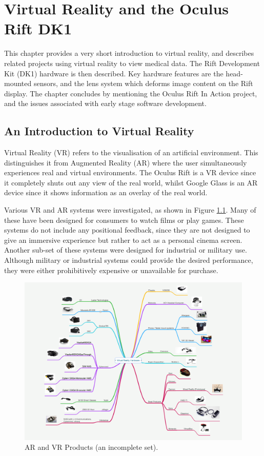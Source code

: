 \documentclass[MSc,paper=a4,pagesize=auto]{icldt}
\begin{document}
\chapter{Virtual Reality and the Oculus Rift DK1}
This chapter provides a very short introduction to virtual reality, and describes related projects using virtual reality to view medical data. The Rift Development Kit (DK1) hardware is then described. Key hardware features are the head-mounted sensors, and the lens system which deforms image content on the Rift display. The chapter concludes by mentioning the Oculus Rift In Action project, and the issues associated with early stage software development.

\clearpage
\section{An Introduction to Virtual Reality}
Virtual Reality (VR) refers to the visualisation of an artificial environment. This distinguishes it from Augmented Reality (AR) where the user simultaneously experiences real and virtual environments. The Oculus Rift is a VR device since it completely shuts out any view of the real world, whilst Google Glass is an AR device since it shows information as an overlay of the real world.

Various VR and AR systems were investigated, as shown in Figure \ref{fig:vr_headsets}. Many of these have been designed for consumers to watch films or play games. These systems do not include any positional feedback, since they are not designed to give an immersive experience but rather to act as a personal cinema screen. Another sub-set of these systems were designed for industrial or military use. Although military or industrial systems could provide the desired performance, they were either prohibitively expensive or unavailable for purchase. 

\begin{figure}[htbp!]
    \centering
    \includegraphics[width=1\textwidth]{resources/vr_headsets}
    \caption{AR and VR Products (an incomplete set).}
    \label{fig:vr_headsets}
\end{figure}
\end{document}
